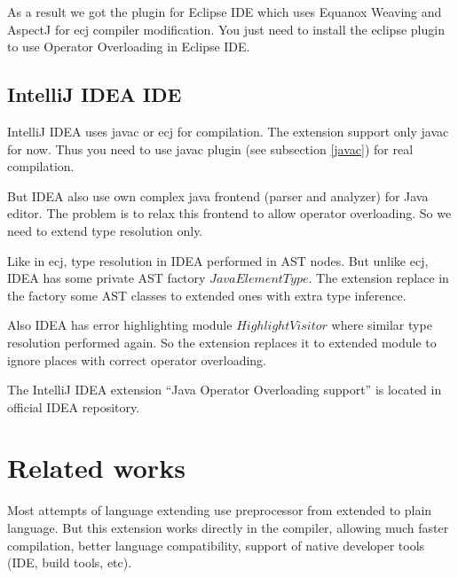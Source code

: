 \documentclass{aircc}
\begin{document}
As a result we got the plugin for Eclipse IDE which uses Equanox Weaving and AspectJ for ecj compiler modification.
You just need to install the eclipse plugin to use Operator Overloading in Eclipse IDE.

\subsection{IntelliJ IDEA IDE \label{idea}}

IntelliJ IDEA uses javac or ecj for compilation. The extension support only javac for now.
Thus you need to use javac plugin (see subsection \ref{javac}) for real compilation.

But IDEA also use own complex java frontend (parser and analyzer) for Java editor.
The problem is to relax this frontend to allow operator overloading. So we need to extend type resolution only.

Like in ecj, type resolution in IDEA performed in AST nodes. 
But unlike ecj, IDEA has some private AST factory $JavaElementType$.
The extension replace in the factory some AST classes to extended ones with extra type inference.

Also IDEA has error highlighting module $HighlightVisitor$ where similar type resolution performed again.
So the extension replaces it to extended module to ignore places with correct operator overloading.

The IntelliJ IDEA extension ``Java Operator Overloading support'' is located in official IDEA repository.





\section{Related works}

Most attempts of language extending use preprocessor from extended to plain language.
But this extension works directly in the compiler, 
allowing much faster compilation, better language compatibility,
support of native developer tools (IDE, build tools, etc).
\end{document}

